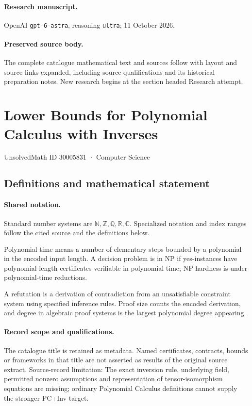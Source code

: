 \documentclass[11pt]{article}
\begin{document}
\paragraph{Research manuscript.} OpenAI \texttt{gpt-6-astra}, reasoning \texttt{ultra}; 11 October 2026.
\paragraph{Preserved source body.} The complete catalogue mathematical text and sources follow with layout and source links expanded, including source qualifications and its historical preparation notes. New research begins at the section headed Research attempt.

\section{Lower Bounds for Polynomial Calculus with Inverses}\label{30005831}
{\small UnsolvedMath ID 30005831 · Computer Science}
\subsection{Definitions and mathematical statement}

\paragraph{Shared notation.}Standard number systems are $\mathbb N,\mathbb Z,\mathbb Q,\mathbb R,\mathbb C$. Specialized notation and index ranges follow the cited source and the definitions below.


Polynomial time means a number of elementary steps bounded by a polynomial in the encoded input length. A decision problem is in $\mathrm{NP}$ if yes-instances have polynomial-length certificates verifiable in polynomial time; NP-hardness is under polynomial-time reductions.

A refutation is a derivation of contradiction from an unsatisfiable constraint system using specified inference rules. Proof size counts the encoded derivation, and degree in algebraic proof systems is the largest polynomial degree appearing.
\paragraph{Record scope and qualifications.}
The catalogue title is retained as metadata. Named certificates, contracts, bounds or frameworks in that title are not asserted as results of the original source extract.
Source-record limitation: The exact inversion rule, underlying field, permitted nonzero assumptions and representation of tensor-isomorphism equations are missing; ordinary Polynomial Calculus definitions cannot supply the stronger PC+Inv target.
\end{document}
